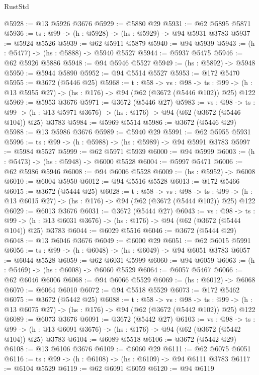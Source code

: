 \begin{lexlean}{RustStd}
\begin{coremodule}
@5928 := @13 @5926 @3676
@5929 := @5880 @29
@5931 := @62 @5895 @5871
@5936 := {ts : @99} -> (h : @5928) -> (hs : @5929) -> @94 @5931 @3783
@5937 := @5924 @5526
@5939 := @62 @5911 @5879
@5940 := @94 @5939
@5943 := (h : @5477) -> (hs : @5888) -> @5940 @5527
@5944 := @5937 @5475
@5946 := @62 @5926 @5886
@5948 := @94 @5946 @5527
@5949 := (hs : @5892) -> @5948
@5950 := @5944 @5890
@5952 := @94 @5514 @5527
@5953 := @172 @5470
@5955 := @3672 (@5446 @25)
@5968 := {t : @58} ->
  {vs : @98} ->
  {ts : @99} -> (h : @13 @5955 @27) -> (hs : @176) -> @94 (@62 (@3672 (@5446 @102)) @25) @122
@5969 := @5953 @3676
@5971 := @3672 (@5446 @27)
@5983 := {vs : @98} ->
  {ts : @99} -> (h : @13 @5971 @3676) -> (hs : @176) -> @94 (@62 (@3672 (@5446 @104)) @25) @3783
@5984 := @5969 @5514
@5986 := @3672 (@5446 @29)
@5988 := @13 @5986 @3676
@5989 := @5940 @29
@5991 := @62 @5955 @5931
@5996 := {ts : @99} -> (h : @5988) -> (hs : @5989) -> @94 @5991 @3783
@5997 := @5984 @5527
@5999 := @62 @5971 @5939
@6000 := @94 @5999
@6003 := (h : @5473) -> (hs : @5948) -> @6000 @5528
@6004 := @5997 @5471
@6006 := @62 @5986 @5946
@6008 := @94 @6006 @5528
@6009 := (hs : @5952) -> @6008
@6010 := @6004 @5950
@6012 := @94 @5516 @5528
@6013 := @172 @5466
@6015 := @3672 (@5444 @25)
@6028 := {t : @58} ->
  {vs : @98} ->
  {ts : @99} -> (h : @13 @6015 @27) -> (hs : @176) -> @94 (@62 (@3672 (@5444 @102)) @25) @122
@6029 := @6013 @3676
@6031 := @3672 (@5444 @27)
@6043 := {vs : @98} ->
  {ts : @99} -> (h : @13 @6031 @3676) -> (hs : @176) -> @94 (@62 (@3672 (@5444 @104)) @25) @3783
@6044 := @6029 @5516
@6046 := @3672 (@5444 @29)
@6048 := @13 @6046 @3676
@6049 := @6000 @29
@6051 := @62 @6015 @5991
@6056 := {ts : @99} -> (h : @6048) -> (hs : @6049) -> @94 @6051 @3783
@6057 := @6044 @5528
@6059 := @62 @6031 @5999
@6060 := @94 @6059
@6063 := (h : @5469) -> (hs : @6008) -> @6060 @5529
@6064 := @6057 @5467
@6066 := @62 @6046 @6006
@6068 := @94 @6066 @5529
@6069 := (hs : @6012) -> @6068
@6070 := @6064 @6010
@6072 := @94 @5518 @5529
@6073 := @172 @5462
@6075 := @3672 (@5442 @25)
@6088 := {t : @58} ->
  {vs : @98} ->
  {ts : @99} -> (h : @13 @6075 @27) -> (hs : @176) -> @94 (@62 (@3672 (@5442 @102)) @25) @122
@6089 := @6073 @3676
@6091 := @3672 (@5442 @27)
@6103 := {vs : @98} ->
  {ts : @99} -> (h : @13 @6091 @3676) -> (hs : @176) -> @94 (@62 (@3672 (@5442 @104)) @25) @3783
@6104 := @6089 @5518
@6106 := @3672 (@5442 @29)
@6108 := @13 @6106 @3676
@6109 := @6060 @29
@6111 := @62 @6075 @6051
@6116 := {ts : @99} -> (h : @6108) -> (hs : @6109) -> @94 @6111 @3783
@6117 := @6104 @5529
@6119 := @62 @6091 @6059
@6120 := @94 @6119

\end{coremodule}
\end{lexlean}
